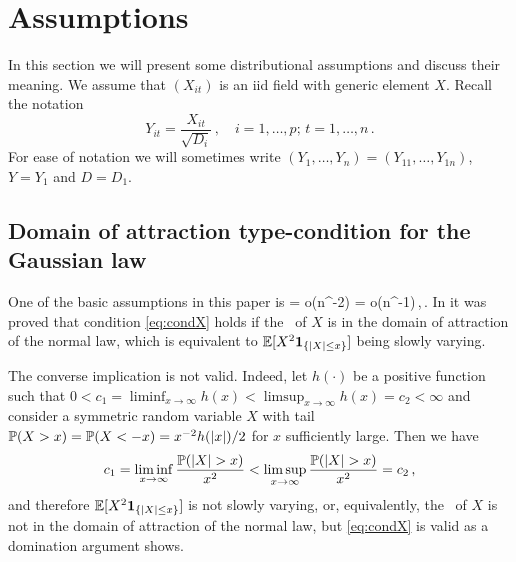 \section{Assumptions}\label{sec:2ch4}
In this section we will present some distributional assumptions and discuss their meaning.
We assume that $(X_{it})$ is an iid field with generic element $X$. Recall the notation
\begin{equation}\label{eq:Yit}
Y_{it}=\frac{X_{it}}{\sqrt{D_i}}\,, \quad i=1,\ldots,p;\, t=1,\ldots,n\,.
\end{equation}
For ease of notation we will sometimes write $(Y_1, \ldots, Y_n)= (Y_{11}, \ldots, Y_{1n})$, $Y=Y_1$ and $D=D_1$.
\subsection{Domain of attraction type-condition for the Gaussian law}
One of the basic assumptions in this paper is
\beam\label{eq:condX}
\E \big[ Y_{1}Y_{2} \big] = o(n^{-2}) \quad  {} \quad  \E \big[ Y_{1}^4 \big] = o(n^{-1})\,,\qquad \nto\,.
\eeam
In \cite{gine:goetze:mason:1997} it was proved that condition \eqref{eq:condX} holds if the \ds\ of 
$X$ is in the domain of attraction of the normal law, which is equivalent to $\E[X^2 \1_{\{|X|\le x\}}]$ being slowly varying. 
\par
The converse implication is not valid. Indeed, let $h(\cdot)$ be a positive function such that $0<c_1 = \liminf_{x \to \infty}h(x) <\limsup_{x \to \infty}h(x) =c_2<\infty$ and consider a symmetric random variable $X$ with tail $\P(X>x)=\P(X<-x)=x^{-2} h(|x|)/2$ for $x$ sufficiently large. Then we have
\begin{equation*}
c_1 = \liminf_{x \to \infty} \frac{\P(|X|>x)}{x^2} <\limsup_{x \to \infty}\frac{\P(|X|>x)}{x^2} =c_2\,,
\end{equation*} 
and therefore $\E[X^2 \1_{\{|X|\le x\}}]$ is not slowly varying, or, equivalently, the \ds\ of $X$ is not in the domain of attraction of the normal law, but \eqref{eq:condX} is valid as a domination argument shows.

